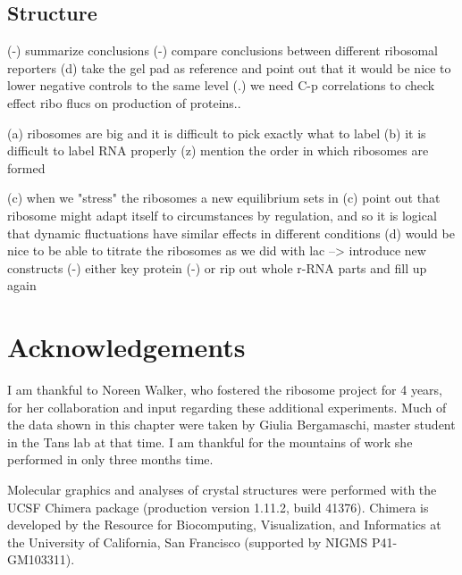 \subsection{Structure}

(-) summarize conclusions
(-) compare conclusions between different ribosomal reporters
(d) take the gel pad as reference and point out that it would be nice to lower negative controls to the same level
(.) we need C-p correlations to check effect ribo flucs on production of proteins..


(a) ribosomes are big and it is difficult to pick exactly what to label
(b) it is difficult to label RNA properly
(z) mention the order in which ribosomes are formed \cite{Chen2013}

(c) when we "stress" the ribosomes a new equilibrium sets in
    (c) point out that ribosome might adapt itself to circumstances by regulation, and so it is logical that dynamic fluctuations have similar effects in different conditions
(d) would be nice to be able to titrate the ribosomes as we did with lac --> introduce new constructs
    (-) either key protein
    (-) or rip out whole r-RNA parts and fill up again






\section{Acknowledgements}

%
I am thankful to Noreen Walker, who fostered the ribosome project for 4 years, for her collaboration and input regarding these additional experiments.
%
Much of the data shown in this chapter were taken by Giulia Bergamaschi, master student in the Tans lab at that time. I am thankful for 
the mountains of work she performed in only three months time.

Molecular graphics and analyses 
of crystal structures
%
were performed with the UCSF Chimera package (production version 1.11.2, build 41376). Chimera is developed by the Resource for Biocomputing, Visualization, and Informatics at the University of California, San Francisco (supported by NIGMS P41-GM103311). 





